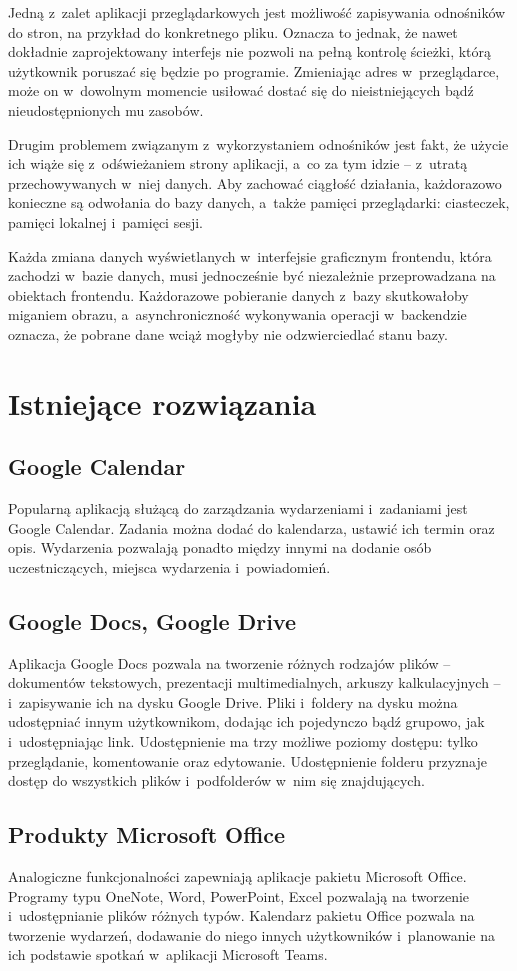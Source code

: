 \documentclass[a4paper,twoside,12pt]{book}
\begin{document}
Jedną z~zalet aplikacji przeglądarkowych jest możliwość zapisywania odnośników do stron, na przykład do konkretnego pliku. Oznacza to jednak, że nawet dokładnie zaprojektowany interfejs nie pozwoli na pełną kontrolę ścieżki, którą użytkownik poruszać się będzie po programie. Zmieniając adres w~przeglądarce, może on w~dowolnym momencie usiłować dostać się do nieistniejących bądź nieudostępnionych mu zasobów.

Drugim problemem związanym z~wykorzystaniem odnośników jest fakt, że użycie ich wiąże się z~odświeżaniem strony aplikacji, a~co za tym idzie -- z~utratą przechowywanych w~niej danych. Aby zachować ciągłość działania, każdorazowo konieczne są odwołania do bazy danych, a~także pamięci przeglądarki: ciasteczek, pamięci lokalnej i~pamięci sesji.

Każda zmiana danych wyświetlanych w~interfejsie graficznym frontendu, która zachodzi w~bazie danych, musi jednocześnie być niezależnie przeprowadzana na obiektach frontendu. Każdorazowe pobieranie danych z~bazy skutkowałoby miganiem obrazu, a~asynchroniczność wykonywania operacji w~backendzie oznacza, że pobrane dane wciąż mogłyby nie odzwierciedlać stanu bazy.

\section{Istniejące rozwiązania}
\subsection{Google Calendar}
Popularną aplikacją służącą do zarządzania wydarzeniami i~zadaniami jest Google Calendar. Zadania można dodać do kalendarza, ustawić ich termin oraz opis. Wydarzenia pozwalają ponadto między innymi na dodanie osób uczestniczących, miejsca wydarzenia i~powiadomień.
\subsection{Google Docs, Google Drive}
Aplikacja Google Docs pozwala na tworzenie różnych rodzajów plików -- dokumentów tekstowych, prezentacji multimedialnych, arkuszy kalkulacyjnych -- i~zapisywanie ich na dysku Google Drive. Pliki i~foldery na dysku można udostępniać innym użytkownikom, dodając ich pojedynczo bądź grupowo, jak i~udostępniając link. Udostępnienie ma trzy możliwe poziomy dostępu: tylko przeglądanie, komentowanie oraz edytowanie. Udostępnienie folderu przyznaje dostęp do wszystkich plików i~podfolderów w~nim się znajdujących.
\subsection{Produkty Microsoft Office}
Analogiczne funkcjonalności zapewniają aplikacje pakietu Microsoft Office. Programy typu OneNote, Word, PowerPoint, Excel pozwalają na tworzenie i~udostępnianie plików różnych typów. Kalendarz pakietu Office pozwala na tworzenie wydarzeń, dodawanie do niego innych użytkowników i~planowanie na ich podstawie spotkań w~aplikacji Microsoft Teams.
\end{document}
